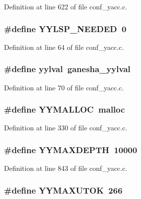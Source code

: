 Definition at line 622 of file conf\_\-yacc.c.
\subsubsection[{YYLSP\_\-NEEDED}]{\setlength{\rightskip}{0pt plus 5cm}\#define YYLSP\_\-NEEDED~0}\label{conf__yacc_8c_abb3943553c2b5e911c89a3ea973d3079}


Definition at line 64 of file conf\_\-yacc.c.
\subsubsection[{yylval}]{\setlength{\rightskip}{0pt plus 5cm}\#define {\bf yylval}~{\bf ganesha\_\-yylval}}\label{conf__yacc_8c_a75acfb3798e577ebd296e604e422e86b}


Definition at line 70 of file conf\_\-yacc.c.
\subsubsection[{YYMALLOC}]{\setlength{\rightskip}{0pt plus 5cm}\#define YYMALLOC~malloc}\label{conf__yacc_8c_a573b05852d8f080c907dfba725773d7a}


Definition at line 330 of file conf\_\-yacc.c.
\subsubsection[{YYMAXDEPTH}]{\setlength{\rightskip}{0pt plus 5cm}\#define YYMAXDEPTH~10000}\label{conf__yacc_8c_a14ba2b263c446ffed1c888c4b42ae40c}


Definition at line 843 of file conf\_\-yacc.c.
\subsubsection[{YYMAXUTOK}]{\setlength{\rightskip}{0pt plus 5cm}\#define YYMAXUTOK~266}\label{conf__yacc_8c_af3f5ed4bc4517eff0ef1b17541192a58}


